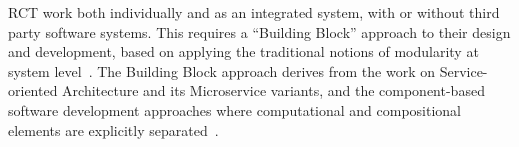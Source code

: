 \documentclass[preprint,12pt, a4paper]{elsarticle}
\begin{document}



RCT work both individually and as an integrated system, with or without third
party software systems. This requires a ``Building Block'' approach to their
design and development, based on applying the traditional notions of modularity
at system level~\cite{turilli2019middleware}. The Building Block approach
derives from the work on Service-oriented Architecture and its Microservice
variants, and the component-based software development approaches where
computational and compositional elements are explicitly
separated~\cite{garlan1995architectural,clemens1998component,schneider2000components}.



\end{document}
